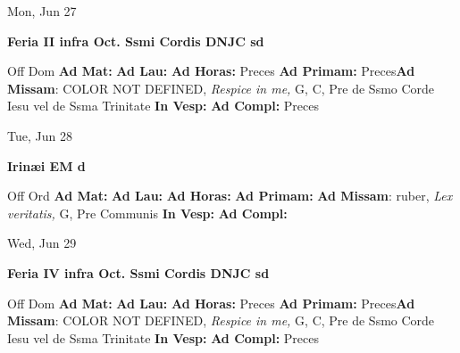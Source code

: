 \documentclass[10pt]{memoir}
\begin{document}
\begin{center}
\begin{minipage}{3.5in}
\vspace{2em}
\begin{center}Mon, Jun 27
\end{center}
\textbf{ \large Feria II infra Oct. Ssmi Cordis DNJC
\textnormal{\normalsize sd}}

\begin{justify}Off Dom
\textbf{Ad Mat: }
\textbf{Ad Lau: }
\textbf{Ad Horas: }Preces
\textbf{Ad Primam: }Preces\textbf{Ad Missam}: COLOR NOT DEFINED, \textit{Respice in me,} G, C, Pre de Ssmo Corde Iesu vel de Ssma Trinitate
\textbf{In Vesp: }
\textbf{Ad Compl: }Preces
\end{justify}
\end{minipage}
\end{center}

\begin{center}
\begin{minipage}{3.5in}
\vspace{2em}
\begin{center}Tue, Jun 28
\end{center}
\textbf{ \large Irinæi EM
\textnormal{\normalsize d}}

\begin{justify}Off Ord
\textbf{Ad Mat: }
\textbf{Ad Lau: }
\textbf{Ad Horas: }
\textbf{Ad Primam: }\textbf{Ad Missam}: ruber, \textit{Lex veritatis,} G, Pre Communis
\textbf{In Vesp: }
\textbf{Ad Compl: }
\end{justify}
\end{minipage}
\end{center}

\begin{center}
\begin{minipage}{3.5in}
\vspace{2em}
\begin{center}Wed, Jun 29
\end{center}
\textbf{ \large Feria IV infra Oct. Ssmi Cordis DNJC
\textnormal{\normalsize sd}}

\begin{justify}Off Dom
\textbf{Ad Mat: }
\textbf{Ad Lau: }
\textbf{Ad Horas: }Preces
\textbf{Ad Primam: }Preces\textbf{Ad Missam}: COLOR NOT DEFINED, \textit{Respice in me,} G, C, Pre de Ssmo Corde Iesu vel de Ssma Trinitate
\textbf{In Vesp: }
\textbf{Ad Compl: }Preces
\end{justify}
\end{minipage}
\end{center}
\end{document}

